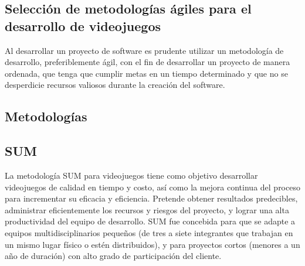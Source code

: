 \documentclass[a4paper, openright, 12pt]{report}
\begin{document}
\clearpage
\subsection{Selección de metodologías ágiles para el desarrollo de videojuegos}\label{sec:estudioM}
\justify
Al desarrollar un proyecto de software es prudente utilizar un metodología de desarrollo, preferiblemente ágil, con el fin de desarrollar un proyecto de manera ordenada, que tenga que cumplir metas en un tiempo determinado y que no se desperdicie recursos valiosos durante la creación del software.
\subsection*{Metodologías}
\subsection*{SUM}
\justify
La metodología SUM para videojuegos tiene como objetivo desarrollar videojuegos de calidad en tiempo y costo, así como la mejora continua del proceso para incrementar su eficacia y eficiencia. Pretende obtener resultados predecibles, administrar eficientemente los recursos y riesgos del proyecto, y lograr una alta productividad del equipo de desarrollo. SUM fue concebida para que se adapte a equipos multidisciplinarios pequeños (de tres a siete integrantes que trabajan en un mismo lugar físico o estén distribuidos), y para proyectos cortos (menores a un año de duración) con alto grado de participación del cliente.\cite{Acerenza2009}\\
\end{document}

